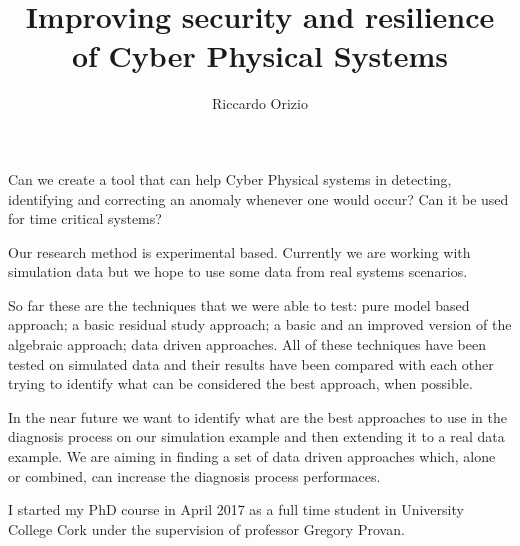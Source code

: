 \documentclass{article}
\title
{
	\vspace{-2cm}
	Improving security and resilience of Cyber Physical Systems
}
\author{Riccardo Orizio}
\date{}
\begin{document}
\maketitle

Can we create a tool that can help Cyber Physical systems in detecting,
identifying and correcting an anomaly whenever one would occur?
Can it be used for time critical systems?

Our research method is experimental based.
Currently we are working with simulation data but we hope to use some data from
real systems scenarios.

So far these are the techniques that we were able to test: pure model based
approach; a basic residual study approach; a basic and an improved
version of the algebraic approach; data driven approaches.
All of these techniques have been tested on simulated data and their results
have been compared with each other trying to identify what can be considered the
best approach, when possible.

In the near future we want to identify what are the best approaches to use in
the diagnosis process on our simulation example and then extending it to a real
data example.
We are aiming in finding a set of data driven approaches which, alone or
combined, can increase the diagnosis process performaces.

I started my PhD course in April 2017 as a full time student in University
College Cork under the supervision of professor Gregory Provan.
\end{document}
